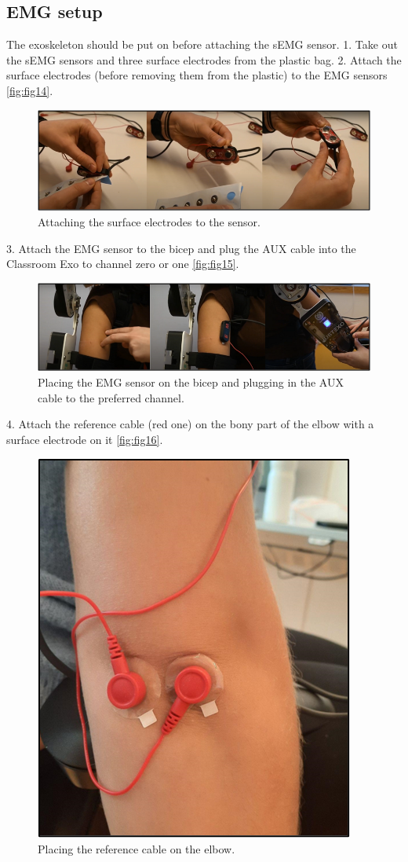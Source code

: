 \newpage
\subsection{EMG setup}
The exoskeleton should be put on before attaching the sEMG sensor. 
1.	Take out the sEMG sensors and three surface electrodes from the plastic bag.
2.	Attach the surface electrodes (before removing them from the plastic) to the EMG sensors \autoref{fig:fig14}. 


\begin{figure}[H]
	\centering
	\includegraphics[width=0.7\linewidth]{img/fig_14}
	\caption{Attaching the surface electrodes to the sensor.}
	\label{fig:fig14}
\end{figure}


3.	Attach the EMG sensor to the bicep and plug the AUX cable into the Classroom Exo to channel zero or one \autoref{fig:fig15}.  

\begin{figure}[H]
	\centering
	\includegraphics[width=0.7\linewidth]{img/fig_15}
	\caption{Placing the EMG sensor on the bicep and plugging in the AUX cable to the preferred channel.}
	\label{fig:fig15}
\end{figure}

4.	Attach the reference cable (red one) on the bony part of the elbow with a surface electrode on it \autoref{fig:fig16}.  

\begin{figure}[H]
	\centering
	\includegraphics[width=0.4\linewidth]{img/fig_16}
	\caption{Placing the reference cable on the elbow.}
	\label{fig:fig16}
\end{figure}

